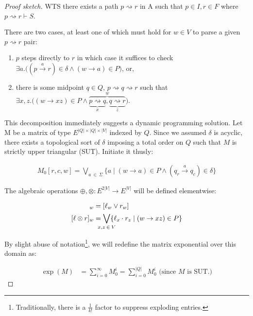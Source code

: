 \documentclass[sigplan,review,acmsmall,nonacm,screen,anonymous]{acmart}\settopmatter{printfolios=false,printccs=false,printacmref=false}
\begin{document}
  \begin{proof}[Proof sketch]
    WTS there exists a path $p \rightsquigarrow r$ in A such that $p\in I, r\in F$ where $p \rightsquigarrow r \vdash S$.\vspace{0.3cm}

    \noindent There are two cases, at least one of which must hold for $w \in V$ to parse a given $p \rightsquigarrow r$ pair:

    \begin{enumerate}
      \item $p$ steps directly to $r$ in which case it suffices to check $\exists a.\big((p \overset{a}{\rightarrow} r)\in \delta \land (w \rightarrow a) \in P\big)$, or,
      \item there is some midpoint $q \in Q$, $p \rightsquigarrow q \rightsquigarrow r$ such that $\exists x, z.\big((w \rightarrow xz) \in P\land\overbrace{\underbrace{p \rightsquigarrow q}_x, \underbrace{q \rightsquigarrow r}_z}^w\big)$.
    \end{enumerate}

    \noindent This decomposition immediately suggests a dynamic programming solution. Let M be a matrix of type $E^{|Q|\times|Q|\times|V|}$  indexed by $Q$. Since we assumed $\delta$ is acyclic, there exists a topological sort of $\delta$ imposing a total order on $Q$ such that $M$ is strictly upper triangular (SUT). Initiate it thusly:

    \begin{align}
      M_0[r, c, w] = \bigvee_{a\:\in\:\Sigma} \{a \mid (w \rightarrow a) \in P \land (q_r \overset{a}{\rightarrow} q_c)\in \delta\}
    \end{align}

    \noindent The algebraic operations $\oplus, \otimes: E^{2|V|} \rightarrow E^{|V|}$ will be defined elementwise:

    \begin{align}
      [\ell \oplus r]_w  &= [\ell_w \lor r_w]\\
      [\ell \otimes r]_w &= \bigvee_{\mathclap{x, z\:\in\:V}}\{\ell_x \cdot r_z \mid (w \rightarrow xz) \in P\}
    \end{align}

    \noindent By slight abuse of notation\footnote{Traditionally, there is a $\frac{1}{k!}$ factor to suppress exploding entries.}, we will redefine the matrix exponential over this domain as:

    \begin{align}
      \exp(M) &= \sum_{i = 0}^\infty M_0^i = \sum_{i = 0}^{|Q|} M_0^i \text { (since $M$ is SUT.)}
    \end{align}


\end{proof}
\end{document}
